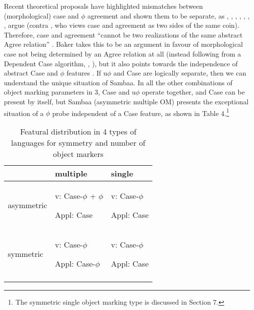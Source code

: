 \documentclass[output=paper
,modfonts
,nonflat]{langsci/langscibook}
\begin{document}
Recent theoretical proposals have highlighted mismatches between (morphological) case and $\phi$ agreement and shown them to be separate, as \citet{Bhatt2005}, \citet{Baker2008a},  \citet{Baker2008b}, \citet{Baker2012}, \citet{Baker2015}, \citet{Bobaljik2008}, \citet{Barany2015}, \citet{Stegovec2015}
argue (contra \citealt{Chomsky2000}, \citealt{Chomsky2001} who views case and agreement as two sides of the same coin). Therefore, case and agreement “cannot be two realizations of the same abstract Agree relation” \citep[272 on Amharic]{Baker2012}. Baker takes this to be an argument in favour of morphological case not being determined by an Agree relation at all (instead following from a Dependent Case algorithm, \citealt{Marantz1991}, \citealt{Baker2015}), but it also points towards the independence of abstract Case and $\phi$ features \citep{Keine2010, Bárány2015}. If u$\phi$ and Case are logically separate, then we can understand the unique situation of Sambaa. In all the other combinations of object marking parameters in 3, Case and u$\phi$ operate together, and Case can be present by itself, but Sambaa (asymmetric multiple OM) presents the exceptional situation of a $\phi$ probe independent of a Case feature, as shown in Table 4.\footnote{The symmetric single object marking type is discussed in Section 7.}
\begin{table}
\label{Table 4}
\caption{Featural distribution in 4 types of languages for symmetry and number of object markers} 
	\begin{tabularx}{\textwidth}{XXX} 
	\lsptoprule	
		& multiple & single\\
	\midrule
		asymmetric & v:       Case-$\phi$ + $\phi$ 
		
		Appl: Case & { v:       Case-$\phi$} 
		
		Appl: Case\\ 
	\midrule
		symmetric & { v:       Case-$\phi$} 
		
		Appl: Case-$\phi$ & { v: Case-$\phi$} 
		
		Appl: Case\\
	\lspbottomrule		
	\end{tabularx}
\end{table}
\end{document}
